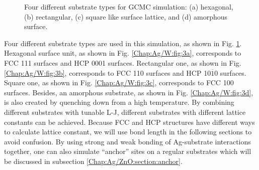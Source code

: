 \begin{figure}[!ht]
  \label{Chap:Ag/W:fig:3d}
\caption[Four different substrate types for GCMC simulation.]{Four different substrate types for GCMC simulation: (a) hexagonal, (b) rectangular, (c) square like surface lattice, and (d) amorphous surface. }
  \label{Chap:Ag/W:fig3}
\end{figure}
\endgroup

Four different substrate types are used in this simulation, as shown in Fig. \ref{Chap:Ag/W:fig3}. Hexagonal surface unit, as shown in Fig. \ref{Chap:Ag/W:fig:3a}, corresponds to \ac{FCC} {111} surfaces and \ac{HCP} {0001} surfaces. Rectangular one, as shown in Fig. \ref{Chap:Ag/W:fig:3b}, corresponds to \ac{FCC} {110} surfaces and \ac{HCP} {10$\overline{1}$0} surfaces. Square one, as shown in Fig. \ref{Chap:Ag/W:fig:3c}, corresponds to \ac{FCC} {100} surfaces. Besides, an amorphous substrate, as shown in Fig. \ref{Chap:Ag/W:fig:3d}, is also created by quenching down from a high temperature. By combining different substrates with tunable \ac{L-J}, different substrates with different lattice constants can be achieved. Because \ac{FCC} and \ac{HCP} structures have different ways to calculate lattice constant, we will use bond length in the following sections to avoid confusion. By using strong and weak bonding of Ag-substrate interactions together, one can also simulate ``anchor'' sites on a regular substrates which will be discussed in subsection \ref{Chap:Ag/ZnO:section:anchor}.